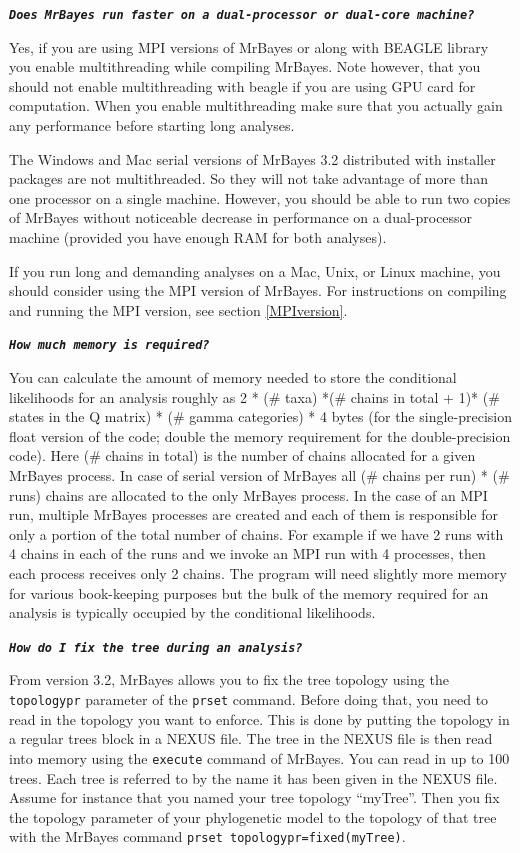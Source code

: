 \documentclass[12pt]{book}
\newcommand{\ttt}[1]{\texttt{#1}}
\newcommand{\tb}[1]{\ttt{\textbf{#1}}}
\begin{document}
\tb{\it{Does MrBayes run faster on a dual-processor or dual-core machine?}}

Yes, if you are using MPI versions of MrBayes or along with BEAGLE library you enable
multithreading while compiling MrBayes. Note however, that you should not enable multithreading
with beagle if you are using GPU card for computation. When you enable multithreading make sure
that you actually gain any performance before starting long analyses.

The Windows and Mac serial versions of MrBayes 3.2 distributed with installer packages are not
multithreaded. So they will not take advantage of more than one processor on a single machine.
However, you should be able to run two copies of MrBayes without noticeable decrease in performance
on a dual-processor machine (provided you have enough RAM for both analyses).

If you run long and demanding analyses on a Mac, Unix, or Linux machine, you should consider using
the MPI version of MrBayes. For instructions on compiling and running the MPI version, see section
\ref{MPIversion}.

\tb{\it{How much memory is required?}}

You can calculate the amount of memory needed to store the conditional likelihoods for an analysis
roughly as 2 * (\# taxa) *(\# chains in total + 1)* (\# states in the Q matrix) * (\# gamma
categories) * 4 bytes (for the single-precision float version of the code; double the memory
requirement for the double-precision code). Here (\# chains in total) is the number of chains
allocated for a given MrBayes process. In case of serial version of MrBayes all (\# chains per run)
* (\# runs) chains are allocated to the only MrBayes process. In the case of an MPI run, multiple
MrBayes processes are created and each of them is responsible for only a portion of the total
number of chains. For example if we have 2 runs with 4 chains in each of the runs and we invoke an
MPI run with 4 processes, then each process receives only 2 chains. The program will need slightly
more memory for various book-keeping purposes but the bulk of the memory required for an analysis
is typically occupied by the conditional likelihoods.

\tb{\it{How do I fix the tree during an analysis?}}

From version 3.2, MrBayes allows you to fix the tree topology using the \ttt{topologypr}
parameter of the \ttt{prset} command. Before doing that, you need to read in the topology you
want to enforce. This is done by putting the topology in a regular trees block in a NEXUS file. The
tree in the NEXUS file is then read into memory using the \ttt{execute} command of MrBayes. You
can read in up to 100 trees. Each tree is referred to by the name it has been given in the NEXUS
file. Assume for instance that you named your tree topology ``myTree''. Then you fix the topology
parameter of your phylogenetic model to the topology of that tree with the MrBayes command
\ttt{prset topologypr=fixed(myTree)}.
\end{document}
